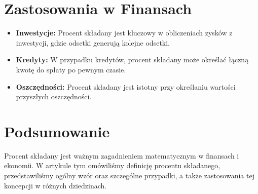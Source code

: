 \documentclass[12pt]{article}
\begin{document}
\section{Zastosowania w Finansach}
\begin{itemize}
  \item \textbf{Inwestycje:} Procent składany jest kluczowy w obliczeniach zysków z inwestycji, gdzie odsetki generują kolejne odsetki.
  
  \item \textbf{Kredyty:} W przypadku kredytów, procent składany może określać łączną kwotę do spłaty po pewnym czasie.
  
  \item \textbf{Oszczędności:} Procent składany jest istotny przy określaniu wartości przyszłych oszczędności.
\end{itemize}

\section{Podsumowanie}
Procent składany jest ważnym zagadnieniem matematycznym w finansach i ekonomii. W artykule tym omówiliśmy definicję procentu składanego, przedstawiliśmy ogólny wzór oraz szczególne przypadki, a także zastosowania tej koncepcji w różnych dziedzinach.
\end{document}
